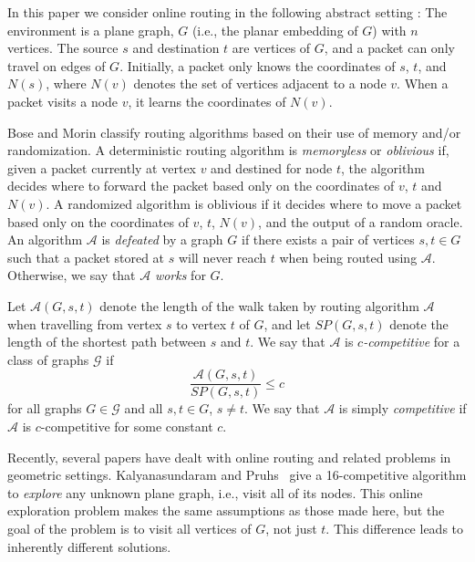 \documentclass{article}
\newcommand{\vsrc}{s}
\newcommand{\vdest}{t}
\newcommand{\N}{N}
\begin{document}
In this paper we consider online routing in the following abstract
setting \cite{bm99a}: The environment is a plane graph, $G$ (i.e., the
planar embedding of $G$) with $n$ vertices. The source $\vsrc$ and
destination $\vdest$ are vertices of $G$, and a packet can only travel
on edges of $G$.  Initially, a packet only knows the coordinates of
$\vsrc$, $\vdest$, and $\N(\vsrc)$, where $\N(v)$ denotes the set of
vertices adjacent to a node $v$.  When a packet visits a node $v$, it learns
the coordinates of $N(v)$.

\mbox{Bose} and \mbox{Morin} \cite{bm99a} classify routing algorithms
based on their use of memory and/or randomization.  A deterministic
routing algorithm is \emph{memoryless} or \emph{oblivious} if, given a
packet currently at vertex $v$ and destined for node $\vdest$, the
algorithm decides where to forward the packet based only on the
coordinates of $v$, $\vdest$ and $N(v)$. A randomized algorithm is
oblivious if it decides where to move a packet based only on the
coordinates of $v$, $\vdest$, $N(v)$, and the output of a random
oracle.  An algorithm $\mathcal{A}$ is \emph{defeated} by a graph $G$
if there exists a pair of vertices $\vsrc,\vdest\in G$ such that a
packet stored at $\vsrc$ will never reach $\vdest$ when being routed
using $\mathcal{A}$.  Otherwise, we say that $\mathcal{A}$
\emph{works} for $G$.

Let $\mathcal{A}(G,\vsrc,\vdest)$ denote the length of the walk taken
by routing algorithm $\mathcal{A}$ when travelling from vertex $\vsrc$
to vertex $\vdest$ of $G$, and let $\mathit{SP}(G,\vsrc,\vdest)$
denote the length of the shortest path between $\vsrc$ and $\vdest$.
We say that $\mathcal{A}$ is \emph{$c$-competitive} for a class of
graphs $\mathcal{G}$ if
\[
	\frac{\mathcal{A}(G,\vsrc,\vdest)}{\mathit{SP}(G,\vsrc,\vdest)} \le c
\]
for all graphs $G\in\mathcal{G}$ and all $\vsrc,\vdest\in G$,
$\vsrc\neq\vdest$.  We say that $\mathcal{A}$ is simply
\emph{competitive} if $\mathcal{A}$ is $c$-competitive for some
constant $c$.

Recently, several papers have dealt with online routing and related
problems in geometric settings.  Kalyanasundaram and Pruhs
\cite{KaPr94}\ give a 16-competitive algorithm to \emph{explore} any
unknown plane graph, i.e., visit all of its nodes.  This online
exploration problem makes the same assumptions as those made here, but
the goal of the problem is to visit all vertices of $G$, not just
$\vdest$.  This difference leads to inherently different solutions.
\end{document}

